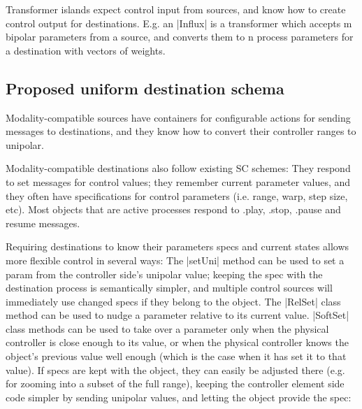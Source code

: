 \documentclass{article}
\newcommand{\todo}[1] {\emph{\textbf{TODO:} #1}}
\begin{document}
Transformer islands expect control input from sources, and know how to create control output for destinations. E.g. an |Influx| is a transformer which accepts m bipolar parameters from a source, and converts them to n process parameters for a destination with vectors of weights. 

\subsection{Proposed uniform destination schema}

% 

Modality-compatible sources have containers for configurable actions for sending messages to destinations, and they know how to convert their controller ranges to unipolar.

Modality-compatible destinations also follow existing SC schemes: They respond to set messages for control values; they remember current parameter values, and they often have specifications for control parameters (i.e. range, warp, step size, etc). Most objects that are active processes respond to .play, .stop, .pause and resume messages. 

Requiring destinations to know their parameters specs and current states allows more flexible control in several ways: 
The |setUni| method can be used to set a param from the controller side's unipolar value; keeping the spec with the destination process is semantically simpler, and multiple control sources will immediately use changed specs if they belong to the object. 
The |RelSet| class method can be used to nudge a parameter relative to its current value. 
|SoftSet| class methods can be used to take over a parameter only when the physical controller is close enough to its value, or when the physical controller knows the object's previous value well enough (which is the case when it has set it to that value). 
If specs are kept with the object, they can easily be adjusted there (e.g. for zooming into a subset of the full range), keeping the controller element side code simpler by sending unipolar values, and letting the object provide the spec:
\end{document}
